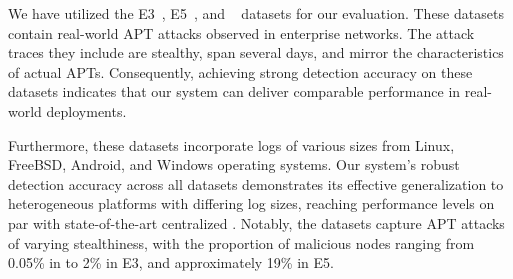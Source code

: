 
 We have utilized the \darpa E3~\cite{error3}, E5~\cite{bug5}, and \optc~\cite{darpaoptc} datasets for our evaluation. These datasets contain real-world APT attacks observed in enterprise networks. The attack traces they include are stealthy, span several days, and mirror the characteristics of actual APTs. Consequently, achieving strong detection accuracy on these datasets indicates that our system can deliver comparable performance in real-world deployments.

Furthermore, these datasets incorporate logs of various sizes from Linux, FreeBSD, Android, and Windows operating systems. Our system’s robust detection accuracy across all datasets demonstrates its effective generalization to heterogeneous platforms with differing log sizes, reaching performance levels on par with state-of-the-art centralized \pids. Notably, the datasets capture APT attacks of varying stealthiness, with the proportion of malicious nodes ranging from 0.05\% in \optc to 2\% in E3, and approximately 19\% in E5.

